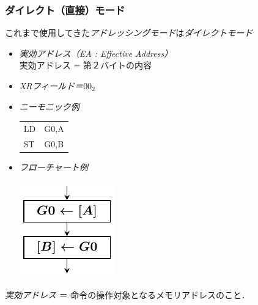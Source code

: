 \documentclass[handout]{beamer}        %
\begin{document}
\begin{frame}
  \frametitle{ダイレクト（直接）モード}
  これまで使用してきた\emph{アドレッシングモード}は\emph{ダイレクトモード}
  \vfill
  \begin{itemize}
  \item \emph{実効アドレス（EA : Effective Address）} \\
    実効アドレス = 第２バイトの内容 \\
    \vfill
  \item \emph{XRフィールド＝$00_2$}
    \vfill
  \item \emph{ニーモニック例} \\
    {\ttfamily\vspace{-0.5cm}\begin{center}
      \begin{tabular}{l l}
        LD & G0,A \\
        ST & G0,B \\
      \end{tabular}
    \end{center}}
    \vfill
  \item \emph{フローチャート例} \\
    \vspace{-0.5cm}\centerline{\includegraphics[scale=0.8]{../Tikz/flowE.pdf}}
  \end{itemize}
  \vfill
  \emph{実効アドレス} ＝ 命令の操作対象となるメモリアドレスのこと．
  \vfill
\end{frame}
\end{document}
